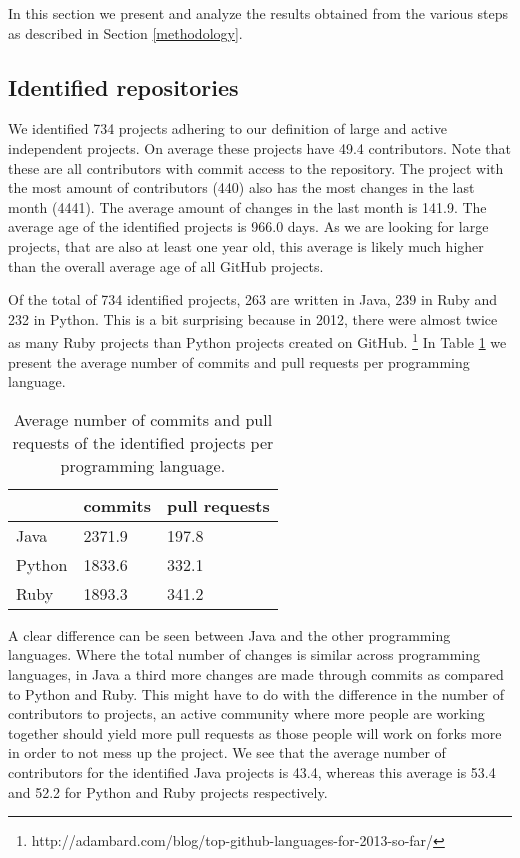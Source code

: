 In this section we present and analyze the results obtained from the various steps as described in Section \ref{methodology}.

\subsection{Identified repositories}
We identified 734 projects adhering to our definition of large and active independent projects.
On average these projects have 49.4 contributors. 
Note that these are all contributors with commit access to the repository.
The project with the most amount of contributors (440) also has the most changes in the last month (4441).
The average amount of changes in the last month is 141.9.
The average age of the identified projects is 966.0 days. 
As we are looking for large projects, that are also at least one year old, this average is likely much higher than the overall average age of all GitHub projects.

Of the total of 734 identified projects, 263 are written in Java, 239 in Ruby and 232 in Python. 
This is a bit surprising because in 2012, there were almost twice as many Ruby projects than Python projects created on GitHub. \footnote{http://adambard.com/blog/top-github-languages-for-2013-so-far/}
In Table \ref{tab:allChanges} we present the average number of commits and pull requests per programming language.
\begin{table}[h]
\begin{tabular}{ l | l l }
 & commits & pull requests\\
\hline
Java & 2371.9 & 197.8 \\
Python & 1833.6 & 332.1 \\
Ruby & 1893.3 & 341.2
\end{tabular}
\caption{Average number of commits and pull requests of the identified projects per programming language.}
\label{tab:allChanges}
\end{table}
A clear difference can be seen between Java and the other programming languages. 
Where the total number of changes is similar across programming languages, in Java a third more changes are made through commits as compared to Python and Ruby.
This might have to do with the difference in the number of contributors to projects, an active community where more people are working together should yield more pull requests as those people will work on forks more in order to not mess up the project. 
We see that the average number of contributors for the identified Java projects is 43.4, whereas this average is 53.4 and 52.2 for Python and Ruby projects respectively.

